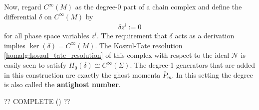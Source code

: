    Now, regard $C^\infty(M)$ as the degree-0 part of a chain complex and define the differential $\delta$ on $C^\infty(M)$ by
    \begin{gather}
        \delta z^i := 0
    \end{gather}
    for all phase space variables $z^i$. The requirement that $\delta$ acts as a derivation implies $\ker(\delta)=C^\infty(M)$. The Koszul-Tate resolution \ref{homalg:koszul_tate_resolution} of this complex with respect to the ideal $\mathcal{N}$ is easily seen to satisfy $H_0(\delta)\cong C^\infty(\Sigma)$. The degree-1 generators that are added in this construction are exactly the ghost momenta $\overline{P}_m$. In this setting the degree is also called the \textbf{antighost number}.

    ?? COMPLETE (\cite{henneaux_teitelboim}) ??